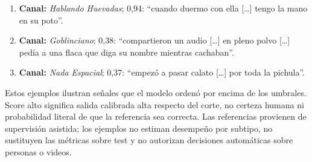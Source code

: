 \begin{enumerate}
\item \textbf{Canal:} \emph{Hablando Huevadas}; 0,94: ``cuando duermo con ella [\ldots] tengo la mano en su poto''.
\item \textbf{Canal:} \emph{Goblinciano}; 0,38: ``compartieron un audio [\ldots] en pleno polvo [\ldots] pedía a una flaca que diga su nombre mientras cachaban''.
\item \textbf{Canal:} \emph{Nada Espacial}; 0,37: ``empezó a pasar calato [\ldots] por toda la pichula''.
\end{enumerate}

Estos ejemplos ilustran señales que el modelo ordenó por encima de los umbrales. Score alto significa salida calibrada alta respecto del corte, no certeza humana ni probabilidad literal de que la referencia sea correcta. Las referencias provienen de supervisión asistida; los ejemplos no estiman desempeño por subtipo, no sustituyen las métricas sobre test y no autorizan decisiones automáticas sobre personas o videos.
